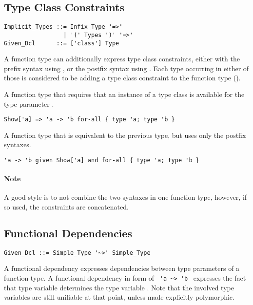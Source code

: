 \subsection{Type Class Constraints}

\syntax\begin{lstlisting}
Implicit_Types ::= Infix_Type '=>'
                 | '(' Types ')' '=>'
Given_Dcl      ::= ['class'] Type
\end{lstlisting}

A function type can additionally express type class constraints, either with the prefix syntax using , or the postfix syntax using . Each type occurring in either of those is considered to be adding a type class constraint to the function type (). 

\example A function type that requires that an instance of a type class  is available for the type parameter .
\begin{lstlisting}
Show['a] => 'a -> 'b for-all { type 'a; type 'b }
\end{lstlisting}

\example A function type that is equivalent to the previous type, but uses only the postfix syntaxes. 
\begin{lstlisting}
'a -> 'b given Show['a] and for-all { type 'a; type 'b }
\end{lstlisting}

\paragraph{Note}
A good style is to not combine the two syntaxes in one function type, however, if so used, the constraints are concatenated. 





\subsection{Functional Dependencies}

\syntax\begin{lstlisting}
Given_Dcl ::= Simple_Type '~>' Simple_Type
\end{lstlisting}

A functional dependency expresses dependencies between type parameters of a function type. A functional dependency in form of ~\lstinline!'a ~> 'b!~ expresses the fact that type variable  determines the type variable . Note that the involved type variables are still unifiable at that point, unless made explicitly polymorphic. 





